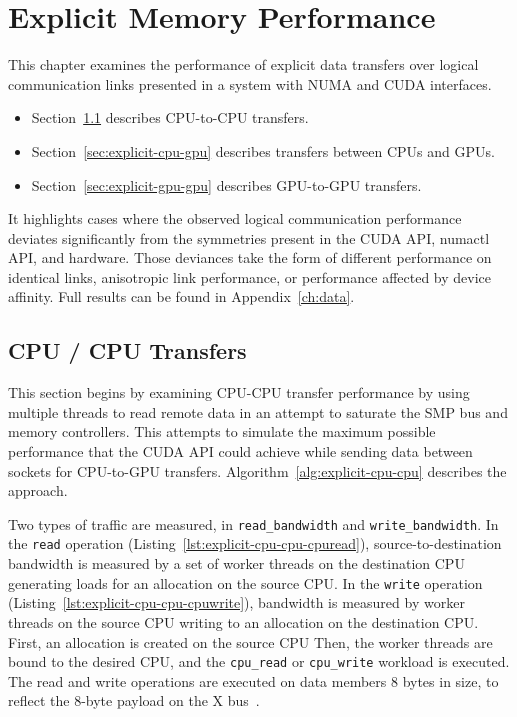 \chapter{Explicit Memory Performance}
\label{ch:explicit}

This chapter examines the performance of explicit data transfers over logical communication links presented in a system with NUMA and CUDA interfaces.
\begin{itemize}
	\item Section~\ref{sec:explicit-cpu-cpu} describes CPU-to-CPU transfers.
	\item Section~\ref{sec:explicit-cpu-gpu} describes transfers between CPUs and GPUs.
	\item Section~\ref{sec:explicit-gpu-gpu} describes GPU-to-GPU transfers.
\end{itemize}
It highlights cases where the observed logical communication performance deviates significantly from the symmetries present in the CUDA API, numactl API, and hardware.
Those deviances take the form of different performance on identical links, anisotropic link performance, or performance affected by device affinity.
Full results can be found in Appendix~\ref{ch:data}.

\section{CPU / CPU Transfers}
\label{sec:explicit-cpu-cpu}

This section begins by examining CPU-CPU transfer performance by using multiple threads to read remote data in an attempt to saturate the SMP bus and memory controllers.
This attempts to simulate the maximum possible performance that the CUDA API could achieve while sending data between sockets for CPU-to-GPU transfers.
Algorithm~\ref{alg:explicit-cpu-cpu} describes the approach.

Two types of traffic are measured, in \texttt{read\_bandwidth} and \texttt{write\_bandwidth}.
In the \texttt{read} operation (Listing~\ref{lst:explicit-cpu-cpu-cpuread}), source-to-destination bandwidth is measured by a set of worker threads on the destination CPU generating loads for an allocation on the source CPU.
In the \texttt{write} operation (Listing~\ref{lst:explicit-cpu-cpu-cpuwrite}), bandwidth is measured by worker threads on the source CPU writing to an allocation on the destination CPU.
First, an allocation is created on the source CPU
Then, the worker threads are bound to the desired CPU, and the \texttt{cpu\_read} or \texttt{cpu\_write} workload is executed.
The read and write operations are executed on data members 8 bytes in size, to reflect the 8-byte payload on the X bus~\cite{caldeira2016s822lc}.

